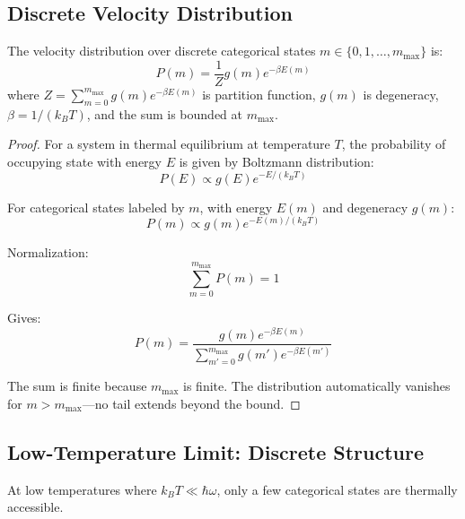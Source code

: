 \begin{definition}
\subsection{Discrete Velocity Distribution}

\begin{theorem}
\label{thm:categorical_maxwell}
The velocity distribution over discrete categorical states $m \in \{0, 1, \ldots, m_{\max}\}$ is:
\begin{equation}
P(m) = \frac{1}{Z} g(m) e^{-\beta E(m)}
\end{equation}
where $Z = \sum_{m=0}^{m_{\max}} g(m) e^{-\beta E(m)}$ is partition function, $g(m)$ is degeneracy, $\beta = 1/(k_BT)$, and the sum is bounded at $m_{\max}$.
\end{theorem}

\begin{proof}
For a system in thermal equilibrium at temperature $T$, the probability of occupying state with energy $E$ is given by Boltzmann distribution:
\begin{equation}
P(E) \propto g(E) e^{-E/(k_BT)}
\end{equation}

For categorical states labeled by $m$, with energy $E(m)$ and degeneracy $g(m)$:
\begin{equation}
P(m) \propto g(m) e^{-E(m)/(k_BT)}
\end{equation}

Normalization:
\begin{equation}
\sum_{m=0}^{m_{\max}} P(m) = 1
\end{equation}

Gives:
\begin{equation}
P(m) = \frac{g(m) e^{-\beta E(m)}}{\sum_{m'=0}^{m_{\max}} g(m') e^{-\beta E(m')}}
\end{equation}

The sum is finite because $m_{\max}$ is finite. The distribution automatically vanishes for $m > m_{\max}$—no tail extends beyond the bound.
\end{proof}

\subsection{Low-Temperature Limit: Discrete Structure}

At low temperatures where $k_B T \ll \hbar\omega$, only a few categorical states are thermally accessible.


\end{definition}
